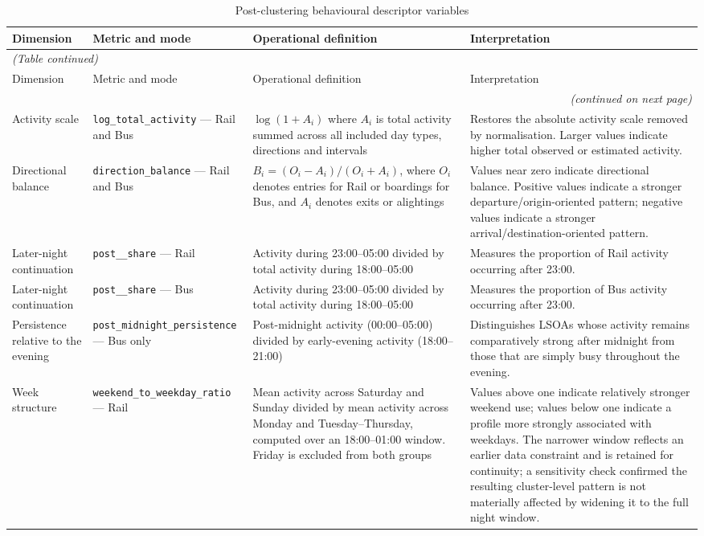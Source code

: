 \begingroup
\small
\setlength{\LTpre}{0pt}
\setlength{\LTpost}{12pt}
\begin{longtable}{@{}p{2.25cm} p{3.05cm} p{5.15cm} p{4.25cm}@{}}
\caption[Post-clustering behavioural descriptors]{Post-clustering behavioural descriptor variables} \\
\toprule
Dimension & Metric and mode & Operational definition & Interpretation \\
\midrule
\endfirsthead
\multicolumn{4}{l}{\small\itshape (Table continued)} \\
\toprule
Dimension & Metric and mode & Operational definition & Interpretation \\
\midrule
\endhead
\bottomrule
\multicolumn{4}{r}{\small\itshape (continued on next page)} \\
\endfoot
\bottomrule
\endlastfoot
Activity scale & \texttt{log\_\allowbreak total\_\allowbreak activity} --- Rail and Bus & $\log(1+A_i)$ where $A_i$ is total activity summed across all included day types, directions and intervals & Restores the absolute activity scale removed by normalisation. Larger values indicate higher total observed or estimated activity. \\
Directional balance & \texttt{direction\_\allowbreak balance} --- Rail and Bus & $B_i = (O_i - A_i)/(O_i + A_i)$, where $O_i$ denotes entries for Rail or boardings for Bus, and $A_i$ denotes exits or alightings & Values near zero indicate directional balance. Positive values indicate a stronger departure/origin-oriented pattern; negative values indicate a stronger arrival/destination-oriented pattern. \\
Later-night continuation & \texttt{post\_\allowbreak 2300\_\allowbreak share} --- Rail & Activity during 23:00--05:00 divided by total activity during 18:00--05:00 & Measures the proportion of Rail activity occurring after 23:00. \\
Later-night continuation & \texttt{post\_\allowbreak 2300\_\allowbreak share} --- Bus & Activity during 23:00--05:00 divided by total activity during 18:00--05:00 & Measures the proportion of Bus activity occurring after 23:00. \\
Persistence relative to the evening & \texttt{post\_\allowbreak midnight\_\allowbreak persistence} --- Bus only & Post-midnight activity (00:00--05:00) divided by early-evening activity (18:00--21:00) & Distinguishes LSOAs whose activity remains comparatively strong after midnight from those that are simply busy throughout the evening. \\
Week structure & \texttt{weekend\_\allowbreak to\_\allowbreak weekday\_\allowbreak ratio} --- Rail & Mean activity across Saturday and Sunday divided by mean activity across Monday and Tuesday--Thursday, computed over an 18:00--01:00 window. Friday is excluded from both groups & Values above one indicate relatively stronger weekend use; values below one indicate a profile more strongly associated with weekdays. The narrower window reflects an earlier data constraint and is retained for continuity; a sensitivity check confirmed the resulting cluster-level pattern is not materially affected by widening it to the full night window. \\

\end{longtable}
